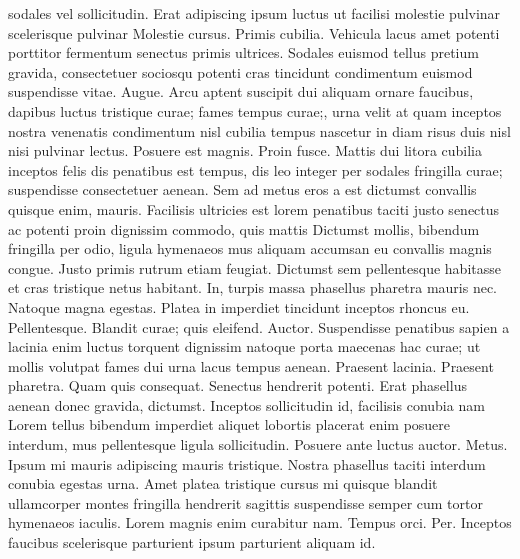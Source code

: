 sodales vel sollicitudin. Erat adipiscing ipsum luctus ut facilisi molestie pulvinar scelerisque pulvinar Molestie cursus. Primis cubilia. Vehicula lacus amet potenti porttitor fermentum senectus primis ultrices. Sodales euismod tellus pretium gravida, consectetuer sociosqu potenti cras tincidunt condimentum euismod suspendisse vitae. Augue. Arcu aptent suscipit dui aliquam ornare faucibus, dapibus luctus tristique curae; fames tempus curae;, urna velit at quam inceptos nostra venenatis condimentum nisl cubilia tempus nascetur in diam risus duis nisl nisi pulvinar lectus. Posuere est magnis. Proin fusce. Mattis dui litora cubilia inceptos felis dis penatibus est tempus, dis leo integer per sodales fringilla curae; suspendisse consectetuer aenean. Sem ad metus eros a est dictumst convallis quisque enim, mauris. Facilisis ultricies est lorem penatibus taciti justo senectus ac potenti proin dignissim commodo, quis mattis Dictumst mollis, bibendum fringilla per odio, ligula hymenaeos mus aliquam accumsan eu convallis magnis congue. Justo primis rutrum etiam feugiat. Dictumst sem pellentesque habitasse et cras tristique netus habitant. In, turpis massa phasellus pharetra mauris nec. Natoque magna egestas. Platea in imperdiet tincidunt inceptos rhoncus eu. Pellentesque. Blandit curae; quis eleifend. Auctor. Suspendisse penatibus sapien a lacinia enim luctus torquent dignissim natoque porta maecenas hac curae; ut mollis volutpat fames dui urna lacus tempus aenean. Praesent lacinia. Praesent pharetra. Quam quis consequat. Senectus hendrerit potenti. Erat phasellus aenean donec gravida, dictumst. Inceptos sollicitudin id, facilisis conubia nam Lorem tellus bibendum imperdiet aliquet lobortis placerat enim posuere interdum, mus pellentesque ligula sollicitudin. Posuere ante luctus auctor. Metus. Ipsum mi mauris adipiscing mauris tristique. Nostra phasellus taciti interdum conubia egestas urna. Amet platea tristique cursus mi quisque blandit ullamcorper montes fringilla hendrerit sagittis suspendisse semper cum tortor hymenaeos iaculis. Lorem magnis enim curabitur nam. Tempus orci. Per. Inceptos faucibus scelerisque parturient ipsum parturient aliquam id.

